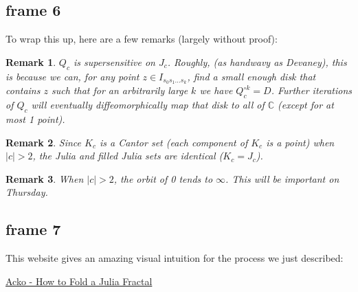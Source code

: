 \documentclass[xcolor=x11names,compress]{beamer}
\renewcommand{\(}{\begin{columns}}
\renewcommand{\)}{\end{columns}}
\newcommand{\<}[1]{\begin{column}{#1}}
\renewcommand{\>}{\end{column}}
\newtheorem{rmk}{Remark}
\begin{document}
\subsection{frame 6}
\begin{frame}

To wrap this up, here are a few remarks (largely without proof):

\vspace{.1cm}
\pause

\begin{rmk}
$Q_c$ is supersensitive on $J_c$. Roughly, (as handwavy as Devaney), this is because we can, for any point $z \in I_{s_0s_1\ldots s_k}$, find a small enough disk that contains $z$ such that for an arbitrarily large $k$ we have $Q_c^{\circ k} = D$. Further iterations of $Q_c$ will eventually diffeomorphically map that disk to 
all of $\mathbb{C}$ (except for at most 1 point).
\end{rmk}

\pause

\begin{rmk}
Since $K_c$ is a Cantor set (each component of $K_c$ is a point) when $|c| > 2$, the Julia and filled Julia sets are identical ($K_c = J_c$).
\end{rmk}

\pause

\begin{rmk}
When $|c| > 2$, the orbit of 0 tends to $\infty$. This will be important on Thursday.
\end{rmk}

\end{frame}





\subsection{frame 7}
\begin{frame}


This website gives an amazing visual intuition for the process we just described:

\vspace{.5cm}



\begin{itemize}
{\color{DeepSkyBlue4}
	\item \href{http://acko.net/blog/how-to-fold-a-julia-fractal/}{Acko - How to Fold a Julia Fractal}
}
\end{itemize}

\end{frame}
\end{document}

